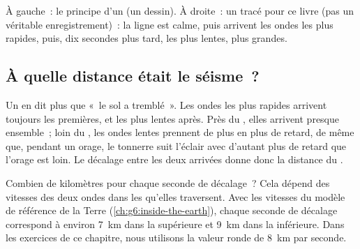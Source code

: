 \begin{omfigure}
{\small À gauche~: le principe d'un  (un dessin). À droite~: un
 tracé pour ce livre (pas un véritable enregistrement)~: la
ligne est calme, puis arrivent les ondes les plus rapides, puis, dix
secondes plus tard, les plus lentes, plus grandes.}
\label{fig:g7:earthquakes:seismometer}
\end{omfigure}

\subsection*{À quelle distance était le séisme~?}

Un  en dit plus que «~le sol a tremblé~». Les ondes les plus
rapides arrivent toujours les premières, et les plus lentes après. Près du
, elles arrivent presque ensemble~; loin du , les ondes lentes
prennent de plus en plus de retard, de même que, pendant un orage, le
tonnerre suit l'éclair avec d'autant plus de retard que l'orage est loin.
Le décalage entre les deux arrivées donne donc la distance du .

Combien de kilomètres pour chaque seconde de décalage~? Cela dépend des
vitesses des deux ondes dans les  qu'elles traversent. Avec les
vitesses du modèle de référence de la Terre (\cref{ch:g6:inside-the-earth}),
chaque seconde de décalage correspond à environ \qty{7}{km} dans la 
supérieure et \qty{9}{km} dans la  inférieure. Dans les exercices de
ce chapitre, nous utilisons la valeur ronde de \qty{8}{km} par seconde.

